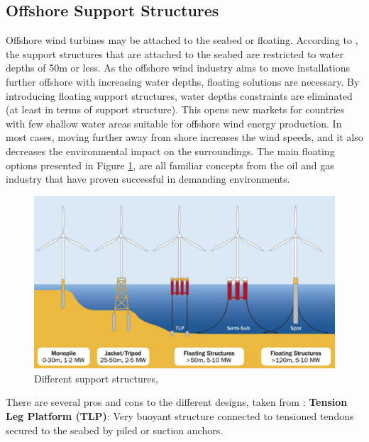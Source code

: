 \subsection{Offshore Support Structures}
Offshore wind turbines may be attached to the seabed or floating. According to \cite{IRENA2016}, the support structures that are attached to the seabed are restricted to water depths of 50m or less. As the offshore wind industry aims to move installations further offshore with increasing water depths, floating solutions are necessary. By introducing floating support structures, water depths constraints are eliminated (at least in terms of support structure). This opens new markets for countries with few shallow water areas suitable for offshore wind energy production. In most cases, moving further away from shore increases the wind speeds, and it also decreases the environmental impact on the surroundings. The main floating options presented in Figure \ref{fig:supstruc}, are all familiar concepts from the oil and gas industry that have proven successful in demanding environments. 

\begin{figure}[H]
\centering
\includegraphics[scale=0.6]{figures/supstruc}
\caption[$\; \:$Different support structures]{Different support structures, \cite{Bailey2014}}
 \label{fig:supstruc}
\end{figure}

\noindent There are several pros and cons to the different designs, taken from \cite{IRENA2016}: \newline
\newline
\textbf{Tension Leg Platform (TLP)}: Very buoyant structure connected to tensioned tendons secured to the seabed by piled or suction anchors.

